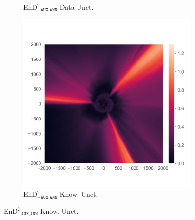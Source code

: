 \begin{figure}
\begin{subfigure}{0.22\textwidth}
  \caption{EnD$^2_{\texttt{+AUX,ANN}}$ Data Unct.}
  \label{fig:3h}
\end{subfigure}%
\begin{subfigure}{0.22\textwidth}
  \centering
  \includegraphics[trim=42 45 15 55, clip, width=\linewidth]{../openreview/plots/3l.png}
  \caption{EnD$^2_{\texttt{+AUX,ANN}}$ Know. Unct.}
  \label{fig:3i}
\end{subfigure}%


\end{figure}
